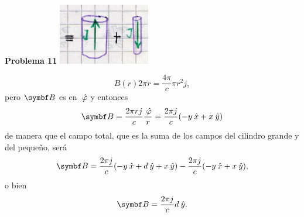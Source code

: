 \documentclass[10pt,oneside]{CBFT_book}
\begin{document}
\begin{ejemplo}{\bf Problema 11}
\includegraphics[width=0.3\textwidth]{images/fig_ft1_problema_11d.jpg}

\[
	B(r) 2 \pi r = \frac{4\pi}{c} \pi r^2 j,
\]
pero $\vb{B}$ es en $\:\hat{\varphi}$ y entonces
\[
	\vb{B} = \frac{2\pi r j}{c} \frac{\phiver}{r} = \frac{2\pi j}{c} ( -y \xver + x \yver )
\]
de manera que el campo total, que es la suma de los campos del cilindro grande
y del pequeño, será
\[
	\vb{B} = \frac{2\pi j}{c}( -y \xver + d\yver + x \yver ) - \frac{2\pi j}{c}( -y \xver + x \yver ),
\]
o bien
\[
	\vb{B} = \frac{2\pi j}{c} d \yver.
\]
 
\end{ejemplo}
\end{document}
